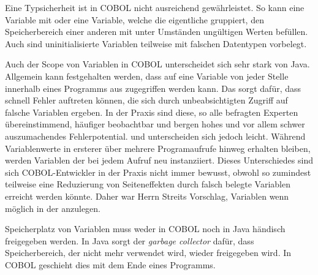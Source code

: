Eine Typsicherheit ist in COBOL nicht ausreichend gewährleistet. So kann eine Variable mit  oder eine Variable, welche die eigentliche gruppiert, den Speicherbereich einer anderen mit unter Umständen ungültigen Werten befüllen. Auch sind uninitialisierte Variablen teilweise mit falschen Datentypen vorbelegt. 

Auch der Scope von Variablen in COBOL unterscheidet sich sehr stark von Java. Allgemein kann festgehalten werden, dass auf eine Variable von jeder Stelle innerhalb eines Programms aus zugegriffen werden kann. Das sorgt dafür, dass schnell Fehler auftreten können, die sich durch unbeabsichtigten Zugriff auf falsche Variablen ergeben. In der Praxis sind diese, so alle befragten Experten übereinstimmend, häufiger beobachtbar und bergen hohes und vor allem schwer auszumachendes Fehlerpotential.  und  unterscheiden sich jedoch leicht. Während Variablenwerte in ersterer über mehrere Programaufrufe hinweg erhalten bleiben, werden Variablen der  bei jedem Aufruf neu instanziiert. Dieses Unterschiedes sind sich COBOL-Entwickler in der Praxis nicht immer bewusst, obwohl so zumindest teilweise eine Reduzierung von Seiteneffekten durch falsch belegte Variablen erreicht werden könnte. Daher war Herrn Streits Vorschlag, Variablen wenn möglich in der  anzulegen.

Speicherplatz von Variablen muss weder in COBOL noch in Java händisch freigegeben werden. In Java sorgt der \textit{garbage collector} dafür, dass Speicherbereich, der nicht mehr verwendet wird, wieder freigegeben wird. In COBOL geschieht dies mit dem Ende eines Programms. 